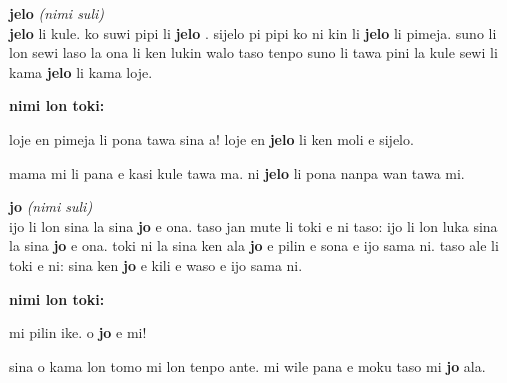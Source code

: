 \documentclass[a4paper,11pt]{book}
\newenvironment{definition}[2]{ %
  \begin{minipage}{\dimexpr\textwidth}
  \begin{description}
  \item
    {\huge \textbf{#1}}
    {\Large \textit{(#2)}} \\
}{
  \end{description}
  \end{minipage}
}
\newenvironment{example}{ %
  \item
  \textbf{nimi lon toki:}

  \hfill
  \begin{minipage}{\dimexpr\textwidth-1cm}
  \begin{itshape}
}
{
  \end{itshape}
  \end{minipage}
}
\newcommand{\inex}[1]{%
  \textbf{#1}%
}
\begin{document}

\begin{definition}{jelo}{nimi suli}
  \inex{jelo} li kule. ko suwi pipi li \inex{jelo}. sijelo pi pipi ko ni kin li \inex{jelo} li pimeja. suno li lon sewi laso la ona li ken lukin walo taso tenpo suno li tawa pini la kule sewi li kama \inex{jelo} li kama loje.
  \begin{example}
    loje en pimeja li pona tawa sina a! loje en \inex{jelo} li ken moli e sijelo.
    
    mama mi li pana e kasi kule tawa ma. ni \inex{jelo} li pona nanpa wan tawa mi.
  \end{example}
\end{definition}

\begin{definition}{jo}{nimi suli}
  ijo li lon sina la sina \inex{jo} e ona. taso jan mute li toki e ni taso: ijo li lon luka sina la sina \inex{jo} e ona. toki ni la sina ken ala \inex{jo} e pilin e sona e ijo sama ni. taso ale li toki e ni: sina ken \inex{jo} e kili e waso e ijo sama ni.
  \begin{example}
    mi pilin ike. o \inex{jo} e mi!

    sina o kama lon tomo mi lon tenpo ante. mi wile pana e moku taso mi \inex{jo} ala.
  \end{example}
\end{definition}
\end{document}
